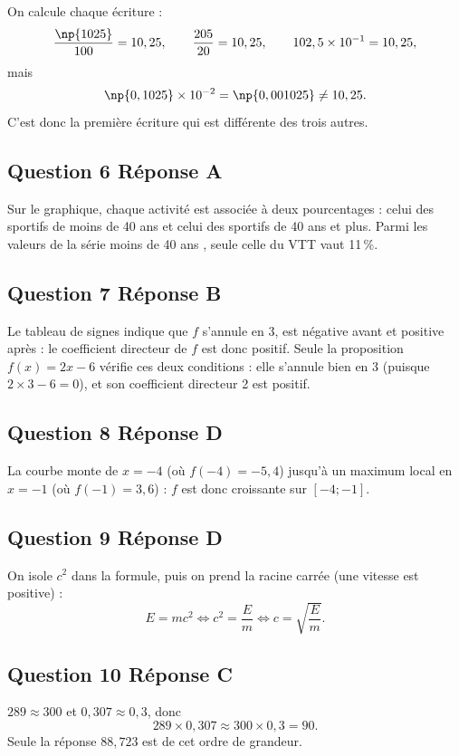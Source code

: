 On calcule chaque écriture :
\[\dfrac{\np{1025}}{100} = 10,25, \qquad \dfrac{205}{20} = 10,25, \qquad 102,5 \times 10^{-1} = 10,25,\]
mais
\[\np{0,1025} \times 10^{-2} = \np{0,001025} \neq 10,25.\]
C'est donc la première écriture qui est différente des trois autres.

\subsection*{Question 6 \quad Réponse A}

Sur le graphique, chaque activité est associée à deux pourcentages : celui des sportifs de
moins de 40 ans et celui des sportifs de 40 ans et plus. Parmi les valeurs de la série \og moins de 40 ans \fg, seule celle du VTT vaut
11\,\%.

\subsection*{Question 7 \quad Réponse B}

Le tableau de signes indique que $f$ s'annule en 3, est négative avant et
positive après : le coefficient directeur de $f$ est donc positif.
Seule la proposition $f(x) = 2x - 6$ vérifie ces deux conditions : elle s'annule bien en 3
(puisque $2 \times 3 - 6 = 0$), et son coefficient directeur 2 est positif.

\subsection*{Question 8 \quad Réponse D}

La courbe monte de $x=-4$ (où $f(-4) = -5,4$) jusqu'à un maximum local en $x=-1$ (où
$f(-1) = 3,6$) : $f$ est donc croissante sur $[-4 ; -1]$.

\subsection*{Question 9 \quad Réponse D}

On isole $c^2$ dans la formule, puis on prend la racine carrée (une vitesse est positive) :
\[E = mc^2 \iff c^2 = \dfrac{E}{m} \iff c = \sqrt{\dfrac{E}{m}}.\]

\subsection*{Question 10 \quad Réponse C}

$289 \approx 300$ et $0,307 \approx 0,3$, donc
\[289 \times 0,307 \approx 300 \times 0,3 = 90.\]
Seule la réponse $88,723$ est de cet ordre de grandeur.

